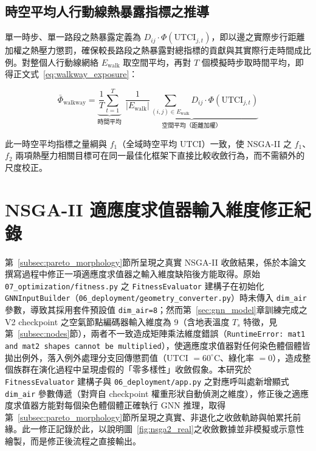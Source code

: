 \subsection{時空平均人行動線熱暴露指標之推導}

單一時步、單一路段之熱暴露定義為 $D_{ij}\cdot\Phi(\text{UTCI}_{j,t})$，即以邊之實際步行距離加權之熱壓力懲罰，確保較長路段之熱暴露對總指標的貢獻與其實際行走時間成比例。對整個人行動線網絡 $E_{\text{walk}}$ 取空間平均，再對 $T$ 個模擬時步取時間平均，即得正文式~\eqref{eq:walkway_exposure}：

\begin{equation}
    \bar{\Phi}_{\text{walkway}}
    = \underbrace{\frac{1}{T}\sum_{t=1}^{T}}_{\text{時間平均}}\ \
      \underbrace{\frac{1}{|E_{\text{walk}}|}\sum_{(i,j)\in E_{\text{walk}}} D_{ij}\cdot\Phi\!\left(\text{UTCI}_{j,t}\right)}_{\text{空間平均（距離加權）}}
\end{equation}

此一時空平均指標之量綱與 $f_1$（全域時空平均 UTCI）一致，使 NSGA-II 之 $f_1$、$f_2$ 兩項熱壓力相關目標可在同一最佳化框架下直接比較收斂行為，而不需額外的尺度校正。


\section{NSGA-II 適應度求值器輸入維度修正紀錄}
\label{appx:fitness_dim_fix}

第~\ref{subsec:pareto_morphology}節所呈現之真實 NSGA-II 收斂結果，係於本論文撰寫過程中修正一項適應度求值器之輸入維度缺陷後方能取得。原始 \texttt{07\_optimization/fitness.py} 之 \texttt{FitnessEvaluator} 建構子在初始化 \texttt{GNNInputBuilder}（\texttt{06\_deployment/geometry\_converter.py}）時未傳入 \texttt{dim\_air} 參數，導致其採用套件預設值 \texttt{dim\_air=8}；然而第~\ref{sec:gnn_model}章訓練完成之 V2 checkpoint 之空氣節點編碼器輸入維度為 9（含地表溫度 $T_s$ 特徵，見第~\ref{subsec:nodes}節），兩者不一致造成矩陣乘法維度錯誤（\texttt{RuntimeError: mat1 and mat2 shapes cannot be multiplied}），使適應度求值器對任何染色體個體皆拋出例外，落入例外處理分支回傳懲罰值（UTCI $=60^\circ\text{C}$、綠化率 $=0$），造成整個族群在演化過程中呈現虛假的「零多樣性」收斂假象。本研究於 \texttt{FitnessEvaluator} 建構子與 \texttt{06\_deployment/app.py} 之對應呼叫處新增顯式 \texttt{dim\_air} 參數傳遞（對齊自 checkpoint 權重形狀自動偵測之維度），修正後之適應度求值器方能對每個染色體個體正確執行 GNN 推理，取得第~\ref{subsec:pareto_morphology}節所呈現之真實、非退化之收斂軌跡與帕累托前緣。此一修正記錄於此，以說明圖~\ref{fig:nsga2_real}之收斂數據並非模擬或示意性繪製，而是修正後流程之直接輸出。


